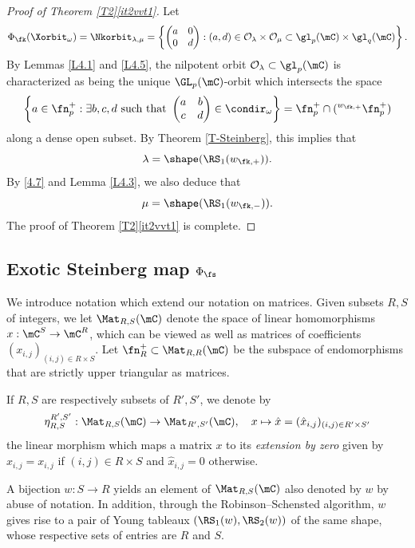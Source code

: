 \begin{proof}[Proof of Theorem \ref{T2}\ref{it2vvt1}]
Let
\[\Phi_\fk(\Xorbit_\omega)=\Nkorbit_{\lambda,\mu}=\left\{\begin{pmatrix} a & 0\\ 0 & d \end{pmatrix}:(a,d)\in\mathcal{O}_\lambda\times\mathcal{O}_\mu\subset\gl_p(\mC)\times\gl_q(\mC)\right\}.\]
By Lemmas \ref{L4.1} and \ref{L4.5}, the nilpotent orbit $\mathcal{O}_\lambda\subset\gl_p(\mC)$ is characterized as being the unique $\GL_p(\mC)$-orbit which intersects the space
\[\left\{a\in\fn_p^+:\exists b,c,d\mbox{ such that }\begin{pmatrix} a & b\\ c & d \end{pmatrix}\in\condir_\omega\right\}=\fn_p^+\cap({}^{w_{\fk,+}}\fn_p^+)\]
along a dense open subset. By Theorem \ref{T-Steinberg}, this implies that
\[\lambda=\shape(\RS_1(w_{\fk,+})).\]
By \eqref{4.7} and Lemma \ref{L4.3}, we also deduce that
\[\mu=\shape(\RS_1(w_{\fk,-})).\]
The proof of Theorem \ref{T2}\ref{it2vvt1} is complete.
\end{proof}

\subsection{Exotic Steinberg map $\Phi_\fs$}

We introduce notation which extend our notation on matrices.
Given subsets $R,S$ of integers, we let $\Mat_{R,S}(\mC)$ denote the space of linear homomorphisms $x:\mC^S\to \mC^R$, which can be viewed as well as matrices of coefficients $(x_{i,j})_{(i,j)\in R\times S}$.
Let $\fn_R^+\subset\Mat_{R,R}(\mC)$ be the subspace of endomorphisms that are strictly upper triangular as matrices. %

If $R,S$ are respectively subsets of $R',S'$, we denote by
\begin{equation}
\label{eta}
\eta_{R,S}^{R',S'}:\Mat_{R,S}(\mC)\to\Mat_{R',S'}(\mC),\quad x\mapsto \hat{x}=(\hat{x}_{i,j})_{(i,j)\in R'\times S'}
\end{equation}
the linear morphism which maps a matrix $x$ to its {\em extension by zero} given by
$\hat{x}_{i,j}=x_{i,j}$ if $(i,j)\in R\times S$ and $\hat{x}_{i,j}=0$ otherwise.

A bijection $w:S\to R$ yields an element of $\Mat_{R,S}(\mC)$ also denoted by $w$ by abuse of notation. In addition, through the Robinson--Schensted algorithm, $w$ gives rise to a pair of Young tableaux $(\RS_1(w),\RS_2(w))$ of the same shape, whose respective sets of entries are $R$ and $S$.

